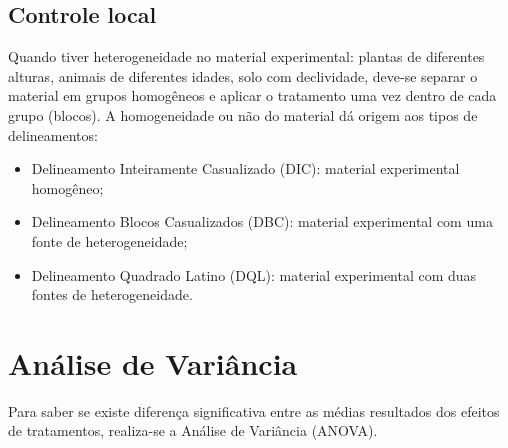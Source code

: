 \documentclass[12pt,brazil,oneside]{book}
\begin{document}
\hypertarget{controle-local}{%
\subsection{Controle local}\label{controle-local}}

Quando tiver heterogeneidade no material experimental: plantas de diferentes alturas, animais de diferentes idades, solo com declividade, deve-se separar o material em grupos homogêneos
e aplicar o tratamento uma vez dentro de cada grupo (blocos).
A homogeneidade ou não do material dá origem aos tipos de delineamentos:

\begin{itemize}
\item
  Delineamento Inteiramente Casualizado (DIC): material experimental homogêneo;
\item
  Delineamento Blocos Casualizados (DBC): material experimental com uma fonte de heterogeneidade;
\item
  Delineamento Quadrado Latino (DQL): material experimental com duas fontes de heterogeneidade.
\end{itemize}

\hypertarget{analise-de-variancia}{%
\section{Análise de Variância}\label{analise-de-variancia}}

Para saber se existe diferença significativa entre as médias resultados dos efeitos de tratamentos, realiza-se a Análise de Variância (ANOVA).
\end{document}

